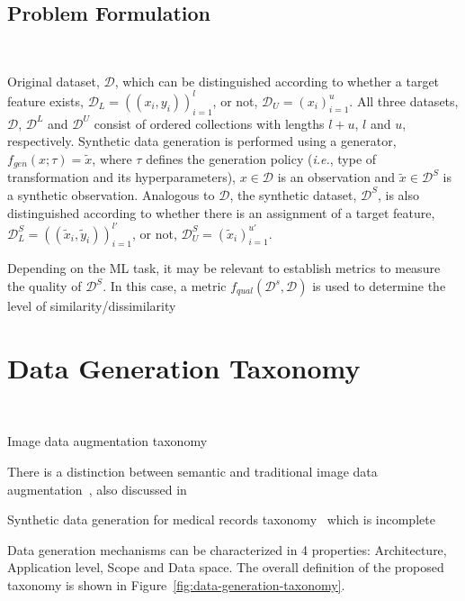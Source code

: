 \documentclass[parskip=full]{scrartcl}
\begin{document}
% 

\subsection{Problem Formulation}~\label{sec:problem-formulation}

Original dataset, $\mathcal{D}$, which can be distinguished according to
whether a target feature exists, $\mathcal{D}_L = {((x_i, y_i))}^l_{i=1}$, or
not, $\mathcal{D}_U = {(x_i)}^{u}_{i=1}$. All three datasets, $\mathcal{D}$,
$\mathcal{D}^L$ and $\mathcal{D}^U$ consist of ordered collections with
lengths $l+u$, $l$ and $u$, respectively. Synthetic data generation is
performed using a generator, $f_{gen}(x;\tau) = \tilde{x}$, where $\tau$
defines the generation policy (\textit{i.e.}, type of transformation and its
hyperparameters), $x \in \mathcal{D}$ is an observation and $\tilde{x} \in
\mathcal{D}^S$ is a synthetic observation. Analogous to $\mathcal{D}$, the
synthetic dataset, $\mathcal{D}^S$, is also distinguished according to whether
there is an assignment of a target feature, $\mathcal{D}^S_L = {((\tilde{x}_i,
\tilde{y}_i))}^{l'}_{i=1}$, or not, $\mathcal{D}^S_U =
{(\tilde{x}_i)}^{u'}_{i=1}$.

Depending on the ML task, it may be relevant to establish metrics to measure
the quality of $\mathcal{D}^S$. In this case, a metric
$f_{qual}(\mathcal{D}^s, \mathcal{D})$ is used to determine the level of
similarity/dissimilarity


\section{Data Generation Taxonomy}~\label{sec:taxonomy}

Image data augmentation taxonomy~\cite{khalifa2021comprehensive}

There is a distinction between semantic and traditional image data
augmentation~\cite{wang2021regularizing}, also discussed
in~\cite{shorten2019survey} 

Synthetic data generation for medical records
taxonomy~\cite{hernandez2022synthetic} which is incomplete



Data generation mechanisms can be characterized in 4 properties: Architecture,
Application level, Scope and Data space. The overall definition of the
proposed taxonomy is shown in Figure~\ref{fig:data-generation-taxonomy}.
\end{document}
